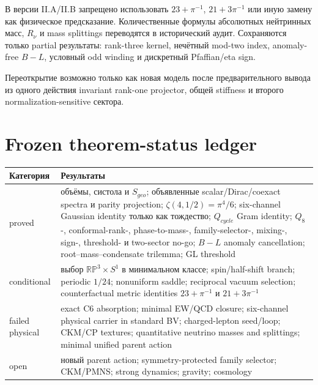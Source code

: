 \begin{nogocriterion}
В версии II.A/II.B запрещено использовать \(23+\pi^{-1}\),
\(21+3\pi^{-1}\) или иную замену как физическое предсказание. Количественные
формулы абсолютных нейтринных масс, \(R_\nu\) и mass splittings переводятся в
исторический аудит. Сохраняются только partial результаты: rank-three kernel,
нечётный mod-two index, anomaly-free \(B-L\), условный odd winding и
дискретный Pfaffian/eta sign.
\end{nogocriterion}

Переоткрытие возможно только как новая модель после предварительного вывода
из одного действия invariant rank-one projector, общей stiffness и второго
normalization-sensitive сектора.

\section{Frozen theorem-status ledger}

\begin{center}
\small
\begin{tabular}{>{\raggedright\arraybackslash}p{}>{\raggedright\arraybackslash}p{}}
\toprule
Категория & Результаты \\
\midrule
proved & объёмы, систола и \(S_{geo}\); объявленные scalar/Dirac/coexact spectra и parity projection; \(\zeta(4,1/2)=\pi^4/6\); six-channel Gaussian identity только как тождество; \(Q_{cycle}\) Gram identity; \(Q_8\)-, conformal-rank-, phase-to-mass-, family-selector-, mixing-, sign-, threshold- и two-sector no-go; \(B-L\) anomaly cancellation; root--mass--condensate trilemma; GL threshold \\
conditional & выбор \(\mathbb{RP}^3\times S^1\) в минимальном классе; spin/half-shift branch; periodic \(1/24\); nonuniform saddle; reciprocal vacuum selection; counterfactual metric identities \(23+\pi^{-1}\) и \(21+3\pi^{-1}\) \\
failed physical & exact C6 absorption; minimal EW/QCD closure; six-channel physical carrier in standard BV; charged-lepton seed/loop; CKM/CP textures; quantitative neutrino masses and splittings; minimal unified parent action \\
open & новый parent action; symmetry-protected family selector; CKM/PMNS; strong dynamics; gravity; cosmology \\
\bottomrule
\end{tabular}
\end{center}

